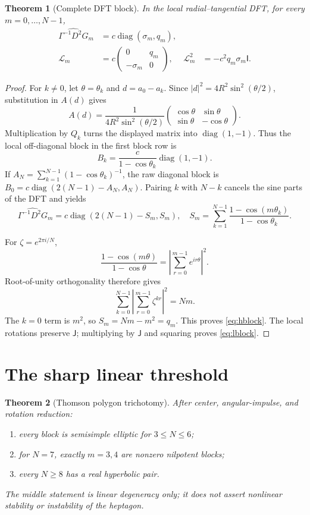 \documentclass[10pt]{article}
\newtheorem{theorem}{Theorem}
\newcommand{\J}{\mathsf J}
\newcommand{\Id}{\mathsf I}
\newcommand{\diag}{\operatorname{diag}}
\begin{document}
\begin{theorem}[Complete DFT block]
In the local radial--tangential DFT, for every $m=0,\ldots,N-1$,
\begin{align}
 \widehat{\Gamma^{-1}D^2G}_m
   &=c\diag(\sigma_m,q_m),                                  \label{eq:hblock}\\
 \mathcal L_m
   &=c\begin{pmatrix}0&q_m\\-\sigma_m&0\end{pmatrix},
 &\mathcal L_m^2&=-c^2q_m\sigma_m\Id.                      \label{eq:lblock}
\end{align}
\end{theorem}

\begin{proof}
For $k\ne0$, let $\theta=\theta_k$ and $d=a_0-a_k$.  Since
$|d|^2=4R^2\sin^2(\theta/2)$, substitution in $A(d)$ gives
\[
 A(d)=\frac1{4R^2\sin^2(\theta/2)}
 \begin{pmatrix}\cos\theta&\sin\theta\\
                 \sin\theta&-\cos\theta\end{pmatrix}.
\]
Multiplication by $Q_k$ turns the displayed matrix into $\diag(1,-1)$.
Thus the local off-diagonal block in the first block row is
\[
 B_k=\frac{c}{1-\cos\theta_k}\diag(1,-1).
\]
If $A_N=\sum_{k=1}^{N-1}(1-\cos\theta_k)^{-1}$, the raw diagonal block is
$B_0=c\diag(2(N-1)-A_N,A_N)$.  Pairing $k$ with $N-k$ cancels the sine
parts of the DFT and yields
\begin{equation}
 \widehat{\Gamma^{-1}D^2G}_m
 =c\diag(2(N-1)-S_m,S_m),
 \quad
 S_m=\sum_{k=1}^{N-1}
 \frac{1-\cos(m\theta_k)}{1-\cos\theta_k}.                 \label{eq:rootsum}
\end{equation}

For $\zeta=e^{2\pi i/N}$,
\[
 \frac{1-\cos(m\theta)}{1-\cos\theta}
 =\left|\sum_{r=0}^{m-1}e^{ir\theta}\right|^2.
\]
Root-of-unity orthogonality therefore gives
\[
 \sum_{k=0}^{N-1}\left|\sum_{r=0}^{m-1}\zeta^{kr}\right|^2=Nm.
\]
The $k=0$ term is $m^2$, so $S_m=Nm-m^2=q_m$.  This proves
\eqref{eq:hblock}.  The local rotations preserve $\J$; multiplying by $\J$
and squaring proves \eqref{eq:lblock}.
\end{proof}

\section{The sharp linear threshold}

\begin{theorem}[Thomson polygon trichotomy]
After center, angular-impulse, and rotation reduction:
\begin{enumerate}
\item every block is semisimple elliptic for $3\le N\le6$;
\item for $N=7$, exactly $m=3,4$ are nonzero nilpotent blocks;
\item every $N\ge8$ has a real hyperbolic pair.
\end{enumerate}
The middle statement is linear degeneracy only; it does not assert nonlinear
stability or instability of the heptagon.
\end{theorem}
\end{document}
